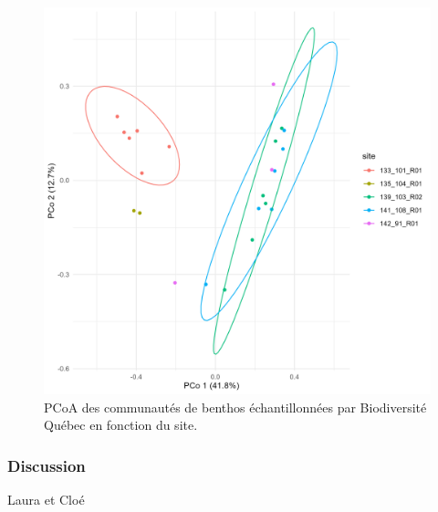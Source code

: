 \documentclass[9pt,twocolumn,twoside,]{pnas-new}
\begin{document}
\begin{figure}
\centering
\includegraphics{ordination_sites.png}
\caption{PCoA des communautés de benthos échantillonnées par
Biodiversité Québec en fonction du site. \label{fig:ordination_sites}}
\end{figure}

\hypertarget{discussion}{%
\subsubsection*{Discussion}\label{discussion}}

Laura et Cloé

\showmatmethods
\showacknow
\pnasbreak



% 
\end{document}
